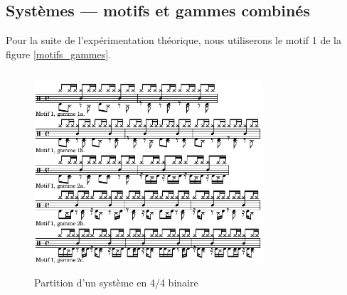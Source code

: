 \subsection*{Systèmes — motifs et gammes combinés}
Pour la suite de l’expérimentation théorique, nous utiliserons le motif 1 de la figure \ref{motifs_gammes}.\\
\begin{figure}[h]
	\centering
	\includegraphics[height=75mm, width=85mm]{z_images/4_experimentations/2_experimentation_theorique/2_systeme_4-4_binaire.png}
	\caption{Partition d’un système en 4/4 binaire}
	\label{sys_binaire}
\end{figure}
